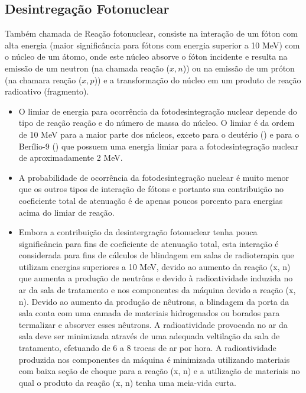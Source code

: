 \documentclass[11pt,a4paper]{article}
\begin{document}
        \subsection{Desintregação Fotonuclear}

            Também chamada de Reação fotonuclear, consiste na interação de um fóton com alta energia (maior significância para fótons com energia superior a 10 MeV) com o núcleo de um átomo, onde este núcleo absorve o fóton incidente e resulta na emissão de um neutron (na chamada reação ($x, n$)) ou na emissão de um próton (na chamara reação ($x, p$)) e a transformação do núcleo em um produto de reação radioativo (fragmento).

                \begin{itemize}
                    \item O limiar de energia para ocorrência da fotodesintegração nuclear depende do tipo de reação reação e do número de massa do núcleo. O limiar é da ordem de 10 MeV para a maior parte dos núcleos, exceto para o deutério () e para o Berílio-9 () que possuem uma energia limiar para a fotodesintegração nuclear de aproximadamente 2 MeV.
                    
                    \item A probabilidade de ocorrência da fotodesintegração nuclear é muito menor que os outros tipos de interação de fótons e portanto sua contribuição no coeficiente total de atenuação é de apenas poucos porcento para energias acima do limiar de reação. 
                    
                    \item Embora a contribuição da desintergração fotonuclear tenha pouca significância para fins de coeficiente de atenuação total, esta interação é considerada para fins de cálculos de blindagem em salas de radioterapia que utilizam energias superiores a 10 MeV, devido ao aumento da reação (x, n) que aumenta a produção de neutrôns e devido à radioatividade induzida no ar da sala de tratamento e nos componentes da máquina devido a reação (x, n). Devido ao aumento da produção de nêutrons, a blindagem da porta da sala conta com uma camada de materiais hidrogenados ou borados para termalizar e absorver esses nêutrons. A radioatividade provocada no ar da sala deve ser minimizada através de uma adequada veltilação da sala de tratamento, efetuando de 6 a 8 trocas de ar por hora.  A radioatividade produzida nos componentes da máquina é minimizada utilizando materiais com baixa seção de choque para a reação (x, n) e a utilização de materiais no qual o produto da reação (x, n) tenha uma meia-vida curta.
                \end{itemize}
\end{document}
